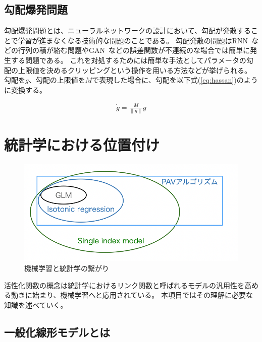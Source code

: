 \subsection{勾配爆発問題}
勾配爆発問題とは、ニューラルネットワークの設計において、勾配が発散することで学習が進まなくなる技術的な問題のことである。
勾配発散の問題はRNN~\cite{rnn}などの行列の積が絡む問題やGAN~\cite{gan}などの誤差関数が不連続のな場合では簡単に発生する問題である。
これを対処するためには簡単な手法としてパラメータの勾配の上限値を決めるクリッピングという操作を用いる方法などが挙げられる。
勾配を$ g $、勾配の上限値を$ M $で表現した場合に、勾配を以下式(\ref{eq:hassan})のように変換する。


\begin{eqnarray}
\dot g = \frac{M}{\|g\|} g
\label{eq:hassan}
\end{eqnarray}




\section{統計学における位置付け}

\begin{figure}[hbtp]
        \includegraphics[width=15cm]{asset/machine_statistics.png}
            \caption{機械学習と統計学の繋がり}
            \label{glm}
\end{figure}

活性化関数の概念は統計学におけるリンク関数と呼ばれるモデルの汎用性を高める動きに始まり、機械学習へと応用されている。
本項目ではその理解に必要な知識を述べていく。



\subsection{一般化線形モデルとは}


